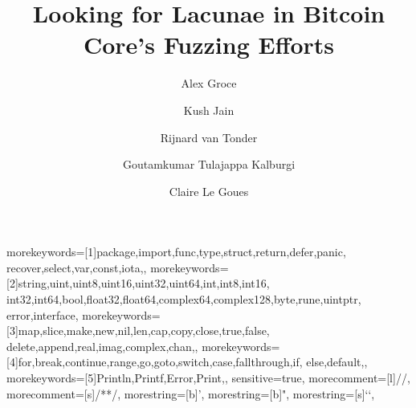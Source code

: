 \documentclass[sigconf,review]{acmart}
\begin{document}
\title{Looking for Lacunae in Bitcoin Core's Fuzzing Efforts}

\author{Alex Groce}

\author{Kush Jain}

\author{Rijnard van Tonder}

\author{Goutamkumar Tulajappa Kalburgi}

\author{Claire Le Goues}

\renewcommand{\shortauthors}{us folks}

\newcommand{\mr}[2]{\multirow{#1}{*}{#2}}
\newcommand{\mc}[3]{\multicolumn{#1}{#2}{#3}}

\newcommand{\clg}[1]{\textcolor{blue}{#1}}
\newcommand{\rvt}[1]{\textcolor{purple}{#1}}
\newcommand{\kj}[1]{\textcolor{olive}{#1}}


\newcommand{\lstbg}[3][0pt]{{\fboxsep#1\colorbox{#2}{\strut #3}}}

%
  {morekeywords=[1]{package,import,func,type,struct,return,defer,panic,%
     recover,select,var,const,iota,},%
   morekeywords=[2]{string,uint,uint8,uint16,uint32,uint64,int,int8,int16,%
     int32,int64,bool,float32,float64,complex64,complex128,byte,rune,uintptr,%
     error,interface},%
   morekeywords=[3]{map,slice,make,new,nil,len,cap,copy,close,true,false,%
     delete,append,real,imag,complex,chan,},%
   morekeywords=[4]{for,break,continue,range,go,goto,switch,case,fallthrough,if,%
     else,default,},%
   morekeywords=[5]{Println,Printf,Error,Print,},%
   sensitive=true,%
   morecomment=[l]{//},%
   morecomment=[s]{/*}{*/},%
   morestring=[b]',%
   morestring=[b]",%
   morestring=[s]{`}{`},%
   }
\end{document}
